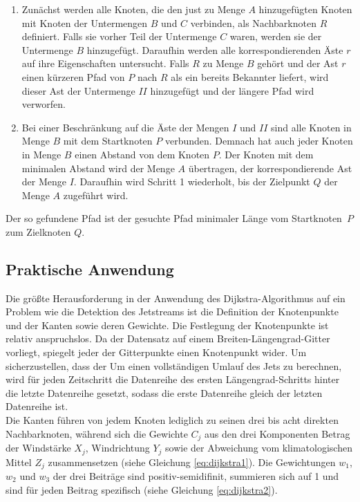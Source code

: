 \begin{enumerate}
  \item Zunächst werden alle Knoten, die den just zu Menge $A$ hinzugefügten Knoten mit Knoten der Untermengen $B$ und $C$ verbinden, als Nachbarknoten $R$ definiert. Falls sie vorher Teil der Untermenge $C$ waren, werden sie der Untermenge $B$ hinzugefügt. Daraufhin werden alle korrespondierenden Äste $r$ auf ihre Eigenschaften untersucht. Falls $R$ zu Menge $B$ gehört und der Ast $r$ einen kürzeren Pfad von $P$ nach $R$ als ein bereits Bekannter liefert, wird dieser Ast der Untermenge $II$ hinzugefügt und der längere Pfad wird verworfen. 
  \item Bei einer Beschränkung auf die Äste der Mengen $I$ und $II$ sind alle Knoten in Menge $B$ mit dem Startknoten $P$ verbunden. Demnach hat auch jeder Knoten in Menge $B$ einen Abstand von dem Knoten $P$. Der Knoten mit dem minimalen Abstand wird der Menge $A$ übertragen, der korrespondierende Ast der Menge $I$. Daraufhin wird Schritt 1 wiederholt, bis der Zielpunkt $Q$ der Menge $A$ zugeführt wird. 
\end{enumerate}
Der so gefundene Pfad ist der gesuchte Pfad minimaler Länge vom Startknoten~$P$ zum Zielknoten $Q$. \citep{dijkstra-1959}
\subsection{Praktische Anwendung}
Die größte Herausforderung in der Anwendung des Dijkstra-Algorithmus auf ein Problem wie die Detektion des Jetstreams ist die Definition der Knotenpunkte und der Kanten sowie deren Gewichte. Die Festlegung der Knotenpunkte ist relativ anspruchslos. Da der Datensatz auf einem Breiten-Längengrad-Gitter vorliegt, spiegelt jeder der Gitterpunkte einen Knotenpunkt wider. Um sicherzustellen, dass der 
Um einen vollständigen Umlauf des Jets zu berechnen, wird für jeden Zeitschritt die Datenreihe des ersten Längengrad-Schritts hinter die letzte Datenreihe gesetzt, sodass die erste Datenreihe gleich der letzten Datenreihe ist.
\\
Die Kanten führen von jedem Knoten lediglich zu seinen drei bis acht direkten Nachbarknoten, während sich die Gewichte $C_j$ aus den drei Komponenten Betrag der Windstärke $X_j$, Windrichtung $Y_j$ sowie der Abweichung vom klimatologischen Mittel $Z_j$ zusammensetzen (siehe Gleichung \ref{eq:dijkstra1}). Die Gewichtungen $w_1$, $w_2$ und $w_3$ der drei Beiträge sind positiv-semidifinit, summieren sich auf 1 und sind für jeden Beitrag spezifisch (siehe Gleichung \ref{eq:dijkstra2}).

